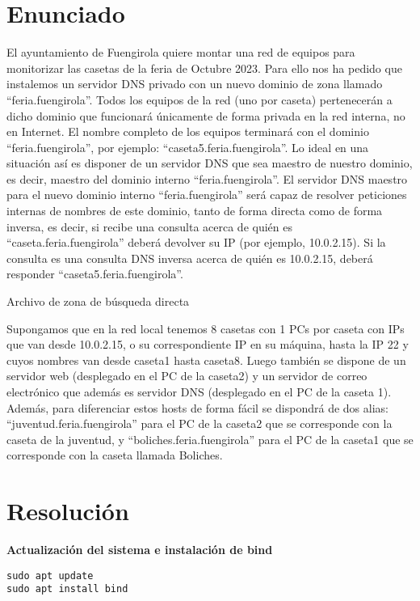 \documentclass{article}
\begin{document}
\section{Enunciado}
\begin{flushleft}
El ayuntamiento de Fuengirola quiere montar una red de equipos para monitorizar las casetas de  la feria de Octubre 2023. Para ello nos ha pedido que instalemos un servidor DNS privado con un nuevo dominio de zona llamado “feria.fuengirola”. Todos los equipos de la red (uno por caseta) pertenecerán a dicho dominio que funcionará únicamente de forma privada en la red interna, no en Internet.
El nombre completo de los equipos terminará con el dominio “feria.fuengirola”, por ejemplo: “caseta5.feria.fuengirola”. Lo ideal en una situación así es disponer de un servidor DNS que sea maestro de nuestro dominio, es decir, maestro del dominio interno “feria.fuengirola”.
El servidor DNS maestro para el nuevo dominio interno “feria.fuengirola” será capaz de resolver peticiones internas de nombres de este dominio, tanto de forma directa como de forma inversa, es decir, si recibe una consulta acerca de quién es “caseta.feria.fuengirola” deberá devolver su IP (por ejemplo, 10.0.2.15). Si la consulta es una consulta DNS inversa acerca de quién es 10.0.2.15, deberá responder “caseta5.feria.fuengirola”.

Archivo de zona de búsqueda directa

Supongamos que en la red local tenemos 8 casetas con 1 PCs por caseta con IPs que van desde 10.0.2.15, o su correspondiente IP en su máquina, hasta la IP 22 y cuyos nombres van desde caseta1 hasta caseta8. Luego también se dispone de un servidor web (desplegado en el PC de la caseta2) y un servidor de correo electrónico que además es servidor DNS (desplegado en el PC de la caseta 1). Además, para diferenciar estos hosts de forma fácil se dispondrá de dos alias: “juventud.feria.fuengirola” para el PC de la caseta2 que se corresponde con la caseta de la juventud, y “boliches.feria.fuengirola” para el PC de la caseta1 que se corresponde con la caseta llamada Boliches.
\end{flushleft}

 \section{Resolución}
 
 \textbf{Actualización del sistema e instalación de bind}
 \lstset{language=C, breaklines=true, basicstyle=\footnotesize}
\begin{lstlisting}[frame=single]
sudo apt update
sudo apt install bind
\end{lstlisting}
 
\end{document}
